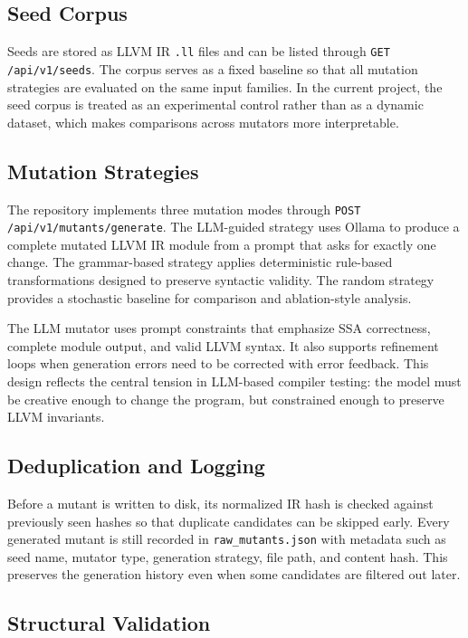 \documentclass[journal]{IEEEtran}
\begin{document}
\subsection{Seed Corpus}

Seeds are stored as LLVM IR \texttt{.ll} files and can be listed through \texttt{GET /api/v1/seeds}. The corpus serves as a fixed baseline so that all mutation strategies are evaluated on the same input families. In the current project, the seed corpus is treated as an experimental control rather than as a dynamic dataset, which makes comparisons across mutators more interpretable.

\subsection{Mutation Strategies}

The repository implements three mutation modes through \texttt{POST /api/v1/mutants/generate}. The LLM-guided strategy uses Ollama to produce a complete mutated LLVM IR module from a prompt that asks for exactly one change. The grammar-based strategy applies deterministic rule-based transformations designed to preserve syntactic validity. The random strategy provides a stochastic baseline for comparison and ablation-style analysis.

The LLM mutator uses prompt constraints that emphasize SSA correctness, complete module output, and valid LLVM syntax. It also supports refinement loops when generation errors need to be corrected with error feedback. This design reflects the central tension in LLM-based compiler testing: the model must be creative enough to change the program, but constrained enough to preserve LLVM invariants.

\subsection{Deduplication and Logging}

Before a mutant is written to disk, its normalized IR hash is checked against previously seen hashes so that duplicate candidates can be skipped early. Every generated mutant is still recorded in \texttt{raw\_mutants.json} with metadata such as seed name, mutator type, generation strategy, file path, and content hash. This preserves the generation history even when some candidates are filtered out later.

\subsection{Structural Validation}
\end{document}
